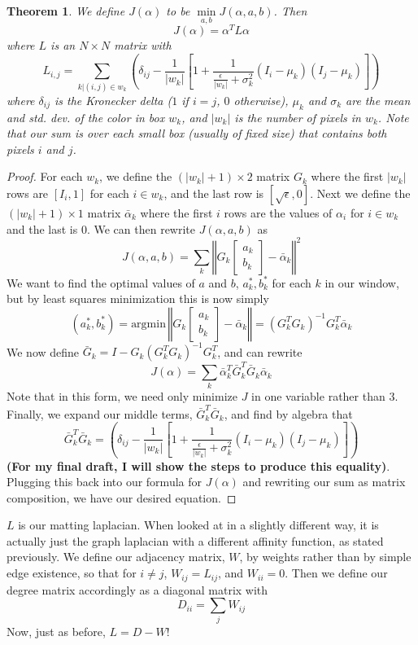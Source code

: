 \newtheorem{matlapthm}{Theorem}
\begin{matlapthm}
We define $J(\alpha)$ to be $\min\limits_{a,b} J(\alpha,a,b)$. Then
\[J(\alpha)=\alpha^{T}L\alpha\]
where $L$ is an $N\times N$ matrix with
\[L_{i,j}=\sum_{k|(i,j)\in w_k}\left(
	\delta_{ij}-\frac{1}{|w_k|}\left[
	1+\frac{1}{\frac{\epsilon}{|w_k|}+\sigma_k^2}
	(I_i-\mu_k)(I_j-\mu_k)
\right]\right)\]
where $\delta_{ij}$ is the Kronecker delta ($1$ if $i=j$, $0$ otherwise), $\mu_k$ and $\sigma_k$ are the mean and std. dev. of the color in box $w_k$, and $|w_k|$ is the number of pixels in $w_k$. Note that our sum is over each small box (usually of fixed size) that contains both pixels $i$ and $j$.
\end{matlapthm}
\begin{proof}
For each $w_k$, we define the $(|w_k|+1)\times2$ matrix $G_k$ where the first $|w_k|$ rows are $[I_i,1]$ for each $i\in w_k$, and the last row is $[\sqrt{\epsilon},0]$. Next we define the $(|w_k|+1)\times1$ matrix $\bar{\alpha}_k$ where the first $i$ rows are the values of $\alpha_i$ for $i\in w_k$ and the last is $0$. We can then rewrite $J(\alpha,a,b)$ as
\[J(\alpha,a,b)=\sum_k\left\Vert
G_k\left[\begin{array}{cc}
a_k \\ b_k
\end{array}\right]
 - \bar{\alpha}_k
\right\Vert^2\]
We want to find the optimal values of $a$ and $b$, $a_k^{*},b_k^{*}$ for each $k$ in our window, but by least squares minimization this is now simply
\[(a_k^*,b_k^*)=\text{argmin}\,
\left\Vert
G_k\left[\begin{array}{cc}
a_k \\ b_k
\end{array}\right]
 - \bar{\alpha}_k
\right\Vert=(G_k^{T}G_k)^{-1}G_k^{T}\bar{\alpha}_k\]
We now define $\bar{G}_k=I-G_k(G_k^TG_k)^{-1}G_k^T$, and can rewrite
\[J(\alpha)=
	\sum_k\bar{\alpha}_k^T\bar{G}_k^T
	      \bar{G}_k\bar{\alpha}_k\]
Note that in this form, we need only minimize $J$ in one variable rather than $3$. Finally, we expand our middle terms, $\bar{G}_k^T \bar{G}_k$, and find by algebra that
\[\bar{G}_k^T \bar{G}_k=\left(
	\delta_{ij}-\frac{1}{|w_k|}\left[
	1+\frac{1}{\frac{\epsilon}{|w_k|}+\sigma_k^2}
	(I_i-\mu_k)(I_j-\mu_k)
\right]\right)\]
\textbf{(For my final draft, I will show the steps to produce this equality)}. Plugging this back into our formula for $J(\alpha)$ and rewriting our sum as matrix composition, we have our desired equation.
\end{proof}
$L$ is our matting laplacian. When looked at in a slightly different way, it is actually just the graph laplacian with a different affinity function, as stated previously. We define our adjacency matrix, $W$, by weights rather than by simple edge existence, so that for $i\neq j$, $W_{ij}=L_{ij}$, and $W_{ii}=0$. Then we define our degree matrix accordingly as a diagonal matrix with
\[D_{ii}=\sum_j W_{ij}\]
Now, just as before, $L=D-W$!